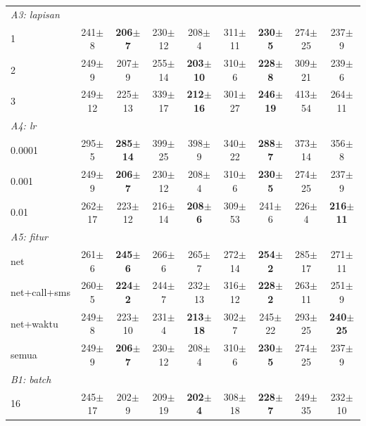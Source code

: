 \begin{table}[t]
\begin{tabular}{@{}lcccccccc@{}}
\midrule
\multicolumn{9}{l}{\textit{A3: lapisan}} \\
\hspace{4pt}1 & 241$\pm$8 & \textbf{206$\pm$7} & 230$\pm$12 & 208$\pm$4 & 311$\pm$11 & \textbf{230$\pm$5} & 274$\pm$25 & 237$\pm$9 \\
\hspace{4pt}2 & 249$\pm$9 & 207$\pm$9 & 255$\pm$14 & \textbf{203$\pm$10} & 310$\pm$6 & \textbf{228$\pm$8} & 309$\pm$21 & 239$\pm$6 \\
\hspace{4pt}3 & 249$\pm$12 & 225$\pm$13 & 339$\pm$17 & \textbf{212$\pm$16} & 301$\pm$27 & \textbf{246$\pm$19} & 413$\pm$54 & 264$\pm$11 \\
\midrule
\multicolumn{9}{l}{\textit{A4: \textit{lr}}} \\
\hspace{4pt}0.0001 & 295$\pm$5 & \textbf{285$\pm$14} & 399$\pm$25 & 398$\pm$9 & 340$\pm$22 & \textbf{288$\pm$7} & 373$\pm$14 & 356$\pm$8 \\
\hspace{4pt}0.001 & 249$\pm$9 & \textbf{206$\pm$7} & 230$\pm$12 & 208$\pm$4 & 310$\pm$6 & \textbf{230$\pm$5} & 274$\pm$25 & 237$\pm$9 \\
\hspace{4pt}0.01 & 262$\pm$17 & 223$\pm$12 & 216$\pm$14 & \textbf{208$\pm$6} & 309$\pm$53 & 241$\pm$6 & 226$\pm$4 & \textbf{216$\pm$11} \\
\midrule
\multicolumn{9}{l}{\textit{A5: fitur}} \\
\hspace{4pt}net & 261$\pm$6 & \textbf{245$\pm$6} & 266$\pm$6 & 265$\pm$7 & 272$\pm$14 & \textbf{254$\pm$2} & 285$\pm$17 & 271$\pm$11 \\
\hspace{4pt}net+call+sms & 260$\pm$5 & \textbf{224$\pm$2} & 244$\pm$7 & 232$\pm$13 & 316$\pm$12 & \textbf{228$\pm$2} & 263$\pm$11 & 251$\pm$9 \\
\hspace{4pt}net+waktu & 249$\pm$8 & 223$\pm$10 & 231$\pm$4 & \textbf{213$\pm$18} & 302$\pm$7 & 245$\pm$22 & 293$\pm$25 & \textbf{240$\pm$25} \\
\hspace{4pt}semua & 249$\pm$9 & \textbf{206$\pm$7} & 230$\pm$12 & 208$\pm$4 & 310$\pm$6 & \textbf{230$\pm$5} & 274$\pm$25 & 237$\pm$9 \\
\midrule
\multicolumn{9}{l}{\textit{B1: batch}} \\
\hspace{4pt}16 & 245$\pm$17 & 202$\pm$9 & 209$\pm$19 & \textbf{202$\pm$4} & 308$\pm$18 & \textbf{228$\pm$7} & 249$\pm$35 & 232$\pm$10 \\

\end{tabular}
\end{table}

